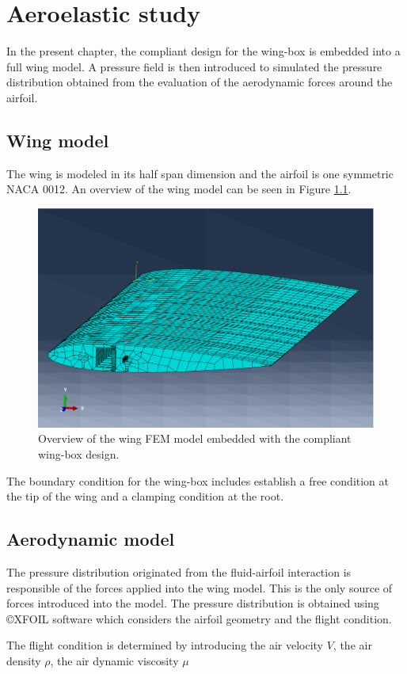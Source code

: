 \chapter{Aeroelastic study} \label{chap:aeroelastic}

  In the present chapter, the compliant design for the wing-box is embedded into a full wing model. A pressure field is then introduced to simulated the pressure distribution obtained from the evaluation of the aerodynamic forces around the airfoil.

  \section{Wing model} \label{sec:wingModel_aeroelastic}

    The wing is modeled in its half span dimension and the airfoil is one symmetric NACA 0012. An overview of the wing model can be seen in Figure \ref{fig:wing}.

    \begin{figure}[!htpb]
      \centering
      \includegraphics[width=0.7 \textwidth]{figures/wing-model/wing}
      \caption[Overview of the wing FEM model embedded with the compliant wing-box design]{Overview of the wing FEM model embedded with the compliant wing-box design.}
      \label{fig:wing}
    \end{figure}
    
    The boundary condition for the wing-box includes establish a free condition at the tip of the wing and a clamping condition at the root.


  \section{Aerodynamic model} \label{sec:aerodynamic_aeroelastic}

    The pressure distribution originated from the fluid-airfoil interaction is responsible of the forces applied into the wing model. This is the only source of forces introduced into the model. The pressure distribution is obtained using \copyright XFOIL software which considers the airfoil geometry and the flight condition.

    The flight condition is determined by introducing the air velocity $V$, the air density $\rho$, the air dynamic viscosity $\mu$